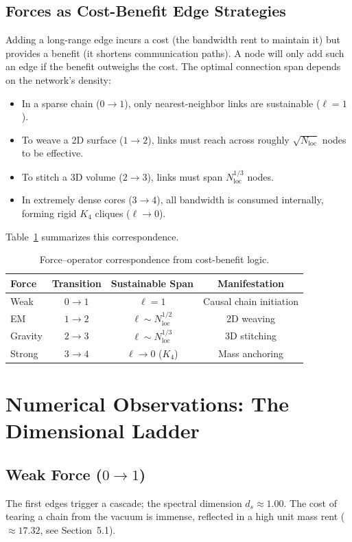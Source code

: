 \documentclass[12pt,a4paper]{article}
\begin{document}
\subsection{Forces as Cost-Benefit Edge Strategies}
Adding a long-range edge incurs a cost (the bandwidth rent to maintain it) but provides a benefit (it shortens communication paths). A node will only add such an edge if the benefit outweighs the cost. The optimal connection span depends on the network's density:
\begin{itemize}
    \item In a sparse chain ($0\to1$), only nearest-neighbor links are sustainable ($\ell=1$).
    \item To weave a 2D surface ($1\to2$), links must reach across roughly $\sqrt{N_{\text{loc}}}$ nodes to be effective.
    \item To stitch a 3D volume ($2\to3$), links must span $N_{\text{loc}}^{1/3}$ nodes.
    \item In extremely dense cores ($3\to4$), all bandwidth is consumed internally, forming rigid $K_4$ cliques ($\ell\to0$).
\end{itemize}
Table~\ref{tab:forces} summarizes this correspondence.

\begin{table}[H]
\centering
\caption{Force--operator correspondence from cost-benefit logic.}
\label{tab:forces}
\begin{tabular}{l c c c}
\toprule
Force & Transition & Sustainable Span & Manifestation \\
\midrule
Weak & $0\to1$ & $\ell=1$ & Causal chain initiation \\
EM & $1\to2$ & $\ell \sim N_{\text{loc}}^{1/2}$ & 2D weaving \\
Gravity & $2\to3$ & $\ell \sim N_{\text{loc}}^{1/3}$ & 3D stitching \\
Strong & $3\to4$ & $\ell\to0$ ($K_4$) & Mass anchoring \\
\bottomrule
\end{tabular}
\end{table}

\section{Numerical Observations: The Dimensional Ladder}

\subsection{Weak Force ($0\to1$)}
The first edges trigger a cascade; the spectral dimension $d_s \approx 1.00$. The cost of tearing a chain from the vacuum is immense, reflected in a high unit mass rent ($\approx 17.32$, see Section~5.1).
\end{document}
